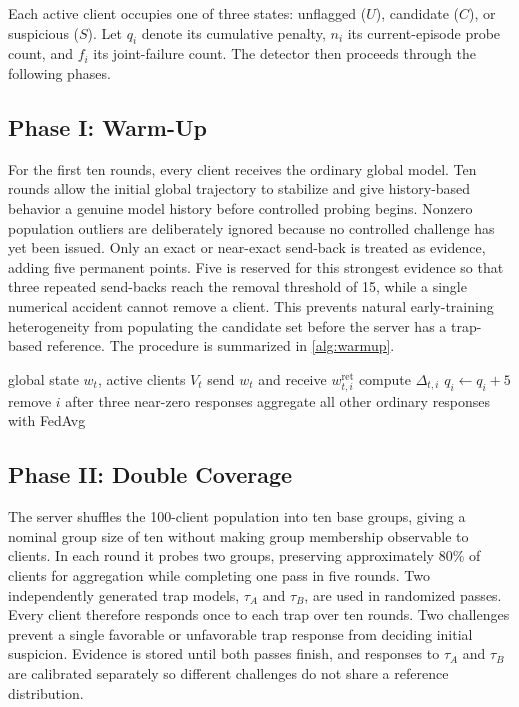 \documentclass[conference]{IEEEtran}
\begin{document}
Each active client occupies one of three states: unflagged ($U$), candidate ($C$), or suspicious ($S$). Let $q_i$ denote its cumulative penalty, $n_i$ its current-episode probe count, and $f_i$ its joint-failure count. The detector then proceeds through the following phases.

\subsection{Phase I: Warm-Up}
For the first ten rounds, every client receives the ordinary global model. Ten rounds allow the initial global trajectory to stabilize and give history-based behavior a genuine model history before controlled probing begins. Nonzero population outliers are deliberately ignored because no controlled challenge has yet been issued. Only an exact or near-exact send-back is treated as evidence, adding five permanent points. Five is reserved for this strongest evidence so that three repeated send-backs reach the removal threshold of 15, while a single numerical accident cannot remove a client. This prevents natural early-training heterogeneity from populating the candidate set before the server has a trap-based reference. The procedure is summarized in \autoref{alg:warmup}.

\begin{algorithm}[t]
\caption{Phase I: warm-up}
\label{alg:warmup}
\begin{algorithmic}[1]
\Require global state $w_t$, active clients $V_t$
 \State send $w_t$ and receive $w^{\mathrm{ret}}_{t,i}$
 \State compute $\Delta_{t,i}$
   \State $q_i\gets q_i+5$
 \EndIf
\EndFor
\State remove $i$ after three near-zero responses
\State aggregate all other ordinary responses with FedAvg
\end{algorithmic}
\end{algorithm}

\subsection{Phase II: Double Coverage}
The server shuffles the 100-client population into ten base groups, giving a nominal group size of ten without making group membership observable to clients. In each round it probes two groups, preserving approximately 80\% of clients for aggregation while completing one pass in five rounds. Two independently generated trap models, $\tau_A$ and $\tau_B$, are used in randomized passes. Every client therefore responds once to each trap over ten rounds. Two challenges prevent a single favorable or unfavorable trap response from deciding initial suspicion. Evidence is stored until both passes finish, and responses to $\tau_A$ and $\tau_B$ are calibrated separately so different challenges do not share a reference distribution.
\end{document}
